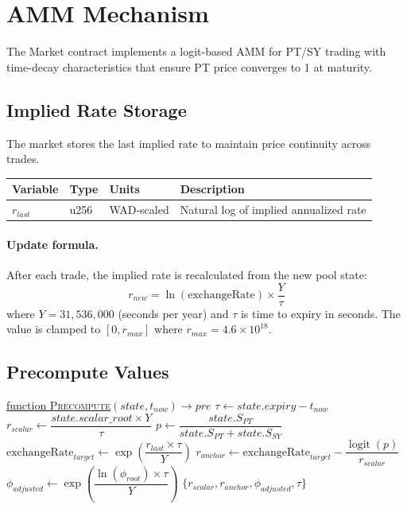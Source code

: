 \section{AMM Mechanism}

The Market contract implements a logit-based AMM for PT/SY trading with time-decay characteristics that ensure PT price converges to 1 at maturity.

\subsection{Implied Rate Storage}

The market stores the last implied rate to maintain price continuity across trades.

\begin{center}
\begin{tabular}{llll}
\toprule
\textbf{Variable} & \textbf{Type} & \textbf{Units} & \textbf{Description} \\
\midrule
$r_{last}$ & u256 & WAD-scaled & Natural log of implied annualized rate \\
\bottomrule
\end{tabular}
\end{center}

\paragraph{Update formula.} After each trade, the implied rate is recalculated from the new pool state:
\[
r_{new} = \ln(\text{exchangeRate}) \times \frac{Y}{\tau}
\]
where $Y = 31{,}536{,}000$ (seconds per year) and $\tau$ is time to expiry in seconds. The value is clamped to $[0, r_{max}]$ where $r_{max} = 4.6 \times 10^{18}$.

\subsection{Precompute Values}

\begin{algorithm}[H]
\caption{Precompute Market Values}
\underline{function \textsc{Precompute}}$(state, t_{now}) \rightarrow pre$\;
\BlankLine
$\tau \gets state.expiry - t_{now}$\;
$r_{scalar} \gets \dfrac{state.scalar\_root \times Y}{\tau}$\;
$p \gets \dfrac{state.S_{PT}}{state.S_{PT} + state.S_{SY}}$\;
\BlankLine
$\text{exchangeRate}_{target} \gets \exp\left(\dfrac{r_{last} \times \tau}{Y}\right)$\;
$r_{anchor} \gets \text{exchangeRate}_{target} - \dfrac{\operatorname{logit}(p)}{r_{scalar}}$\;
\BlankLine
$\phi_{adjusted} \gets \exp\left(\dfrac{\ln(\phi_{root}) \times \tau}{Y}\right)$\;
\BlankLine
\Return $\{r_{scalar}, r_{anchor}, \phi_{adjusted}, \tau\}$\;
\BlankLine
{}
\end{algorithm}

